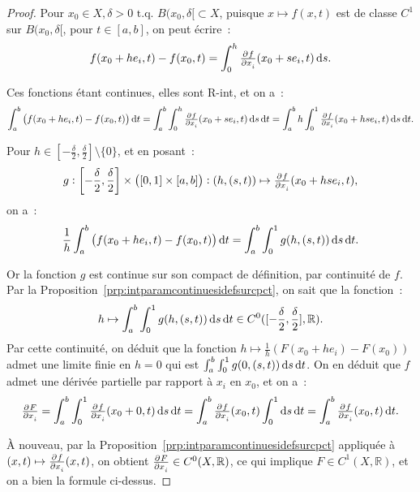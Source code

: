 \documentclass{report}
\theoremstyle{definition}
\theoremstyle{remark}
\numberwithin{equation}{section}
\newcommand{\R}{\mathbb R}
\newcommand{\tq}{\text{ t.q. }}
\begin{document}
			\begin{proof} Pour $x_0 \in X, \delta > 0 \tq B(x_0, \delta[ \subset X$, puisque $x \mapsto f(x, t)$ est de classe $C^1$ sur $B(x_0, \delta[$,
			pour $t \in [a, b]$, on peut écrire~:
			\begin{equation}
				f(x_0 + he_i, t) - f(x_0, t) = \int_0^h \pd f{x_i}(x_0 + se_i, t)\dif s.
			\end{equation}

			Ces fonctions étant continues, elles sont R-int, et on a~:
			\begin{equation}
				\int_a^b\left(f(x_0 + he_i, t) - f(x_0, t)\right)\dif t = \int_a^b\int_0^h \pd f{x_i}(x_0 + se_i, t)\dif s\dif t
				= \int_a^b h\int_0^1\pd f{x_i}(x_0 + hse_i, t)\dif s\dif t.
			\end{equation}

			Pour $h \in \left[-\frac \delta2, \frac \delta2\right] \setminus \{0\}$, et en posant~:
			\begin{equation}
				g : \left[-\frac \delta2, \frac \delta2\right] \times \left([0, 1] \times [a, b]\right) : (h, (s, t)) \mapsto \pd f{x_i}(x_0 + hse_i, t),
			\end{equation}
			on a~:
			\begin{equation}
				\frac 1h\int_a^b \left(f(x_0 + he_i, t) - f(x_0, t)\right)\dif t = \int_a^b\int_0^1g(h, (s, t))\dif s\dif t.
			\end{equation}

			Or la fonction $g$ est continue sur son compact de définition, par continuité de $f$. Par la Proposition~\ref{prp:intparamcontinuesidefsurcpct}, on
			sait que la fonction~:
			\begin{equation}
				h \mapsto \int_a^b\int_0^1g(h, (s, t))\dif s\dif t \in C^0([-\frac \delta2, \frac \delta2], \R).
			\end{equation}
			Par cette continuité, on déduit que la fonction $h \mapsto \frac 1h\left(F(x_0 + he_i) - F(x_0)\right)$ admet une limite finie en $h=0$ qui est
			$\int_a^b\int_0^1g(0, (s, t))\dif s\dif t$. On en déduit que $f$ admet une dérivée partielle par rapport à $x_i$ en $x_0$, et on a~:
			\begin{equation}
				\pd F{x_i} = \int_a^b\int_0^1\pd f{x_i}(x_0 + 0, t)\dif s\dif t = \int_a^b\pd f{x_i}(x_0, t)\int_0^1\dif s\dif t = \int_a^b\pd f{x_i}(x_0, t)\dif t.
			\end{equation}

			À nouveau, par la Proposition~\ref{prp:intparamcontinuesidefsurcpct} appliquée à $(x, t) \mapsto \pd f{x_i}(x, t)$, on obtient
			$\pd F{x_i} \in C^0(X, \R)$, ce qui implique $F \in C^1(X, \R)$, et on a bien la formule ci-dessus.
			\end{proof}
\end{document}
